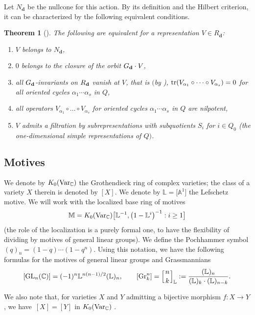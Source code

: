 \documentclass[10pt,a4paper]{amsart}
\numberwithin{equation}{section}
\newtheorem{Theorem}{Theorem}[section]
\theoremstyle{definition}
\begin{document}
Let $N_\mathbf{d}$ be the nullcone for this action. By its definition and the Hilbert criterion, it can be characterized by the following equivalent conditions.

\begin{Theorem}[{\cite[Section 1.4]{LB}}] The following are equivalent for a representation $V\in R_\mathbf{d}$:
\begin{enumerate}\itemsep=0pt
\item[$(1)$] $V$ belongs to $N_\mathbf{d}$,
\item[$(2)$] $0$ belongs to the closure of the orbit $G_{\bf d}\cdot V$,
\item[$(3)$] all $G_{\bf d}$-invariants on $R_{\bf d}$ vanish at $V$, that is $($by {\rm\cite{LP})}, ${\rm tr}(V_{\alpha_1}\circ\dots\circ V_{\alpha_s})=0$ for all oriented cycles $\alpha_1\cdots\alpha_s$ in $Q$,
\item[$(4)$] all operators $V_{\alpha_1}\circ\dots\circ V_{\alpha_s}$ for oriented cycles $\alpha_1\cdots\alpha_s$ in $Q$ are nilpotent,
\item[$(5)$] $V$ admits a filtration by subrepresentations with subquotients $S_i$ for $i\in Q_0$ {\rm (}the one-dimensional simple representations of $Q)$.
\end{enumerate}
\end{Theorem}

\subsection{Motives}

We denote by $K_0({\rm Var}_\mathbb{C})$ the Grothendieck ring of complex varieties; the class of a variety $X$ therein is denoted by $[X]$. We denote by $\mathbb{L}=\big[\mathbb{A}^1\big]$ the Lefschetz motive. We will work with the localized base ring of motives \[\mathbb{M}=K_0({\rm Var}_\mathbb{C})\big[\mathbb{L}^{-1},\bigl(1-\mathbb{L}^i\bigr)^{-1} : i\geq 1\big]\]
(the role of the localization is a purely formal one, to have the flexibility of dividing by motives of general linear groups). We define the Pochhammer symbol $(q)_n=(1-q)\cdots(1-q^n)$. Using this notation, we have the following formulas for the motives of general linear groups and Grassmannians
\[[{\rm GL}_n(\mathbb{C})]=(-1)^n\mathbb{L}^{n(n-1)/2}(\mathbb{L})_n,\qquad [{\rm Gr}_k^n]=\left[{n\atop k}\right]_\mathbb{L}:=\frac{(\mathbb{L})_n}{(\mathbb{L})_k\cdot(\mathbb{L})_{n-k}}.\]

We also note that, for varieties $X$ and $Y$ admitting a bijective morphism $f\colon X\rightarrow Y$, we have~${[X]=[Y]}$ in $K_0({\rm Var}_\mathbb{C})$ \cite[Lemma~2.9]{B}.
\end{document}
